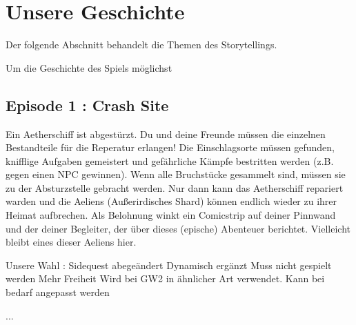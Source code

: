 \chapter{Unsere Geschichte}
\label{cha:ext_storytelling}
Der folgende Abschnitt behandelt die Themen des Storytellings. 


Um die Geschichte des Spiels möglichst
	

\section{Episode 1 : Crash Site} 
Ein Aetherschiff ist abgestürzt. Du und deine Freunde müssen die einzelnen Bestandteile für die Reperatur erlangen! Die Einschlagsorte müssen gefunden, knifflige Aufgaben gemeistert und gefährliche Kämpfe bestritten werden (z.B. gegen einen NPC gewinnen). Wenn alle Bruchstücke gesammelt sind, müssen sie zu der Absturzstelle gebracht werden. Nur dann kann das Aetherschiff repariert warden und die Aeliens (Außerirdisches Shard) können endlich wieder zu ihrer Heimat aufbrechen. Als Belohnung winkt ein Comicstrip auf deiner Pinnwand und der deiner Begleiter, der über dieses (epische) Abenteuer berichtet. Vielleicht bleibt eines dieser Aeliens hier.


Unsere Wahl : Sidequest  abegeändert
Dynamisch ergänzt
Muss nicht gespielt werden
Mehr Freiheit
Wird bei GW2 in ähnlicher Art verwendet.
Kann bei bedarf angepasst werden 

...
